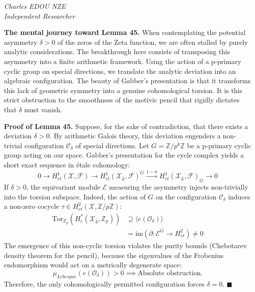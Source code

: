 \documentclass[
]{article}
\begin{document}
\vspace{1cm}\begin{flushright}\textit{Charles EDOU NZE \\ \small Independent Researcher}\end{flushright}


\vspace{1em}
\noindent
\textbf{The mental journey toward Lemma 45.}
When contemplating the potential asymmetry $\delta > 0$ of the zeros of the Zeta function, we are often stalled by purely analytic considerations. The breakthrough here consists of transposing this asymmetry into a finite arithmetic framework. Using the action of a p-primary cyclic group on special directions, we translate the analytic deviation into an algebraic configuration. The beauty of Gabber's presentation is that it transforms this lack of geometric symmetry into a genuine cohomological torsion. It is this strict obstruction to the smoothness of the motivic pencil that rigidly dictates that $\delta$ must vanish.

\vspace{0.5em}
\noindent
\textbf{Proof of Lemma 45.}
Suppose, for the sake of contradiction, that there exists a deviation $\delta > 0$. By arithmetic Galois theory, this deviation engenders a non-trivial configuration $\mathcal{C}_\delta$ of special directions.
Let $G = \mathbb{Z}/p^k\mathbb{Z}$ be a p-primary cyclic group acting on our space. Gabber's presentation for the cycle complex yields a short exact sequence in étale cohomology:
\begin{equation*}
0 \to H^1_{et}(\mathcal{X}, \mathcal{F}) \to H^1_{et}(\mathcal{X}_{\bar{k}}, \mathcal{F})^G \xrightarrow{1 - \sigma} H^1_{et}(\mathcal{X}_{\bar{k}}, \mathcal{F})_G \to 0
\end{equation*}
If $\delta > 0$, the equivariant module $\mathcal{E}$ measuring the asymmetry injects non-trivially into the torsion subspace. Indeed, the action of $G$ on the configuration $\mathcal{C}_\delta$ induces a non-zero cocycle $\tau \in H^2_{et}(\mathcal{X}, \mathbb{Z}/p\mathbb{Z})$:
\begin{align*}
\text{Tor}_{\mathbb{Z}_p}(H^*_c(\mathcal{X}_{\bar{k}}, \mathbb{Z}_p)) &\supseteq \langle e(\mathcal{O}_\delta) \rangle \\
&= \text{im}\left( \partial : \mathcal{E}^G \to H^2_{et} \right) \neq 0
\end{align*}
The emergence of this non-cyclic torsion violates the purity bounds (Chebotarev density theorem for the pencil), because the eigenvalues of the Frobenius endomorphism would act on a metrically degenerate space:
\begin{equation*}
\mu_{Lebesgue}(e(\mathcal{O}_\delta)) > 0 \implies \text{Absolute obstruction.}
\end{equation*}
Therefore, the only cohomologically permitted configuration forces $\delta = 0$.
\hfill $\blacksquare$
\end{document}
